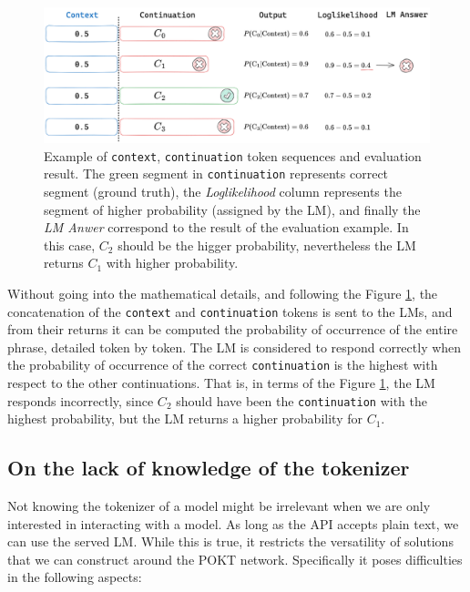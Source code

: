 \begin{figure}[h]
    \centering
    \includegraphics[width=\textwidth]{img/loglikelihood_example.png}
    \caption{Example of \texttt{context}, \texttt{continuation} token sequences and evaluation result. The green segment in \texttt{continuation} represents correct segment (ground truth), the \emph{Loglikelihood} column represents the segment of higher probability (assigned by the \gls{LM}), and finally the \emph{LM Anwer} correspond to the result of the evaluation example. In this case, $C_2$ should be the higger probability, nevertheless the \gls{LM} returns $C_1$ with higher probability.}
    \label{fig:loglikelihood_example}
\end{figure}

Without going into the mathematical details, and following the Figure \ref{fig:loglikelihood_example}, the concatenation of the \texttt{context} and \texttt{continuation} tokens is sent to the \glspl{LM}, and from their returns it can be computed the probability of occurrence of the entire phrase, detailed token by token. 
The \gls{LM} is considered to respond correctly when the probability of occurrence of the correct \texttt{continuation} is the highest with respect to the other continuations. That is, in terms of the Figure \ref{fig:loglikelihood_example}, the \gls{LM} responds incorrectly, since $C_2$ should have been the \texttt{continuation} with the highest probability, but the \gls{LM} returns a higher probability for $C_1$. 


\subsection{On the lack of knowledge of the tokenizer}\label{subsec:b2}

Not knowing the tokenizer of a model might be irrelevant when we are only interested in interacting with a model. As long as the \gls{API} accepts plain text, we can use the served \gls{LM}. While this is true, it restricts the versatility of solutions that we can construct around the POKT network. Specifically it poses difficulties in the following aspects:

